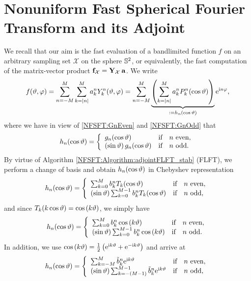 \section{Nonuniform Fast Spherical Fourier Transform and its Adjoint}
\label{NFSFT:NFSFT}
We recall that our aim is the fast evaluation of a bandlimited function $f$ on an arbitrary sampling set $\mathcal{X}$ on 
the sphere $\mathbb{S}^2$, or equivalently, the fast computation of the matrix-vector product 
$\mathbf{f}_{\mathcal{X}} = \mathbf{Y}_{\mathcal{X}} \: \mathbf{a}$. We write
\begin{equation}
  \label{NFSFT:f}
  f{\hspace{-0.4ex}}\left(\vartheta,\varphi\right) = \sum_{n=-M}^M \sum_{k=\left\vert n\right\vert}^M a_k^n Y_{k}^n{\hspace{-0.4ex}}\left(\vartheta,\varphi\right) = 
  \sum_{n=-M}^M \underbrace{\left(\sum_{k=\left\vert n\right\vert}^M a_k^n P_{k}^n{\hspace{-0.4ex}}\left(\cos\vartheta\right)\right)}_{:= h_{n}\,{\hspace{-0.4ex}}\left(\cos\vartheta\right)} \mbox{\rm{e}}^{\mbox{\scriptsize\rm{i}} n \varphi},
\end{equation}
where we have in view of \eqref{NFSFT:GnEven} and \eqref{NFSFT:GnOdd} that
\[
  \fun{h_{n}}{\cos\vtheta} = 
    \left\{\begin{array}{l@{\quad \text{if} \quad}l}
      \fun{g_{n}}{\cos\vtheta} & n \text{ even},\\
      \paren{\sin \vtheta} \fun{g_{n}}{\cos \vtheta} & n \text{ odd}.
    \end{array}\right. 
\]
By virtue of Algorithm \ref{NFSFT:Algorithm:adjointFLFT_stab} (FLFT), we perform a change of basis 
and obtain $h_{n}{\hspace{-0.4ex}}\left(\cos\vartheta\right)$ in Chebyshev representation
\[
  \fun{h_{n}}{\cos\vtheta} = 
    \left\{\begin{array}{l@{\quad \text{if} \quad}l}
      \sum_{k=0}^{M} b_{k}^n \fun{T_{k}}{\cos\vtheta} & n \text{ even},\\
      \paren{\sin \vtheta}\sum_{k=0}^{M-1} b_{k}^n \fun{T_{k}}{\cos\vtheta} & n \text{ odd},
    \end{array}\right. 
\]
and since $T_{k}{\hspace{-0.4ex}}\left(k \cos \vartheta\right) = \cos{\hspace{-0.4ex}}\left(k \vartheta\right)$, we simply have
\[
  \fun{h_{n}}{\cos\vtheta} = 
    \left\{\begin{array}{l@{\quad \text{if} \quad}l}
      \sum_{k=0}^{M} b_{k}^n \fun{\cos}{k \vtheta} & n \text{ even},\\
      \paren{\sin \vtheta}\sum_{k=0}^{M-1} b_{k}^n \fun{\cos}{k \vtheta} & n \text{ odd}.
    \end{array}\right. 
\]
In addition, we use $\cos{\hspace{-0.4ex}}\left(k \vartheta\right) = \frac{1}{2} \left(\mbox{\rm{e}}^{\mbox{\scriptsize\rm{i}} k \vartheta} + \mbox{\rm{e}}^{-\mbox{\scriptsize\rm{i}} k \vartheta}\right)$ 
and arrive at
\[
  \fun{h_{n}}{\cos\vtheta} = 
    \left\{\begin{array}{l@{\quad \text{if} \quad}l}
      \sum_{k=-M}^{M} \tilde{b}_{k}^n \e^{\im k \vtheta} & n \text{ even},\\
      \paren{\sin \vtheta} \sum_{k=-(M-1)}^{M-1} \tilde{b}_{k}^n \e^{\im k \vtheta} & n \text{ odd},
    \end{array}\right. 
\]
